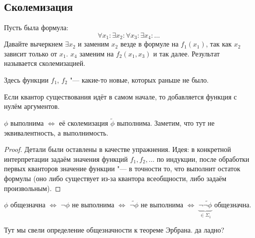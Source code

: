 \subsection{Сколемизация}
\begin{Def}
	Пусть была формула:
	\[ \forall x_1 \colon \exists x_2 \colon \forall x_3 \colon \exists x_4 \colon \dots \]
	Давайте вычеркнем $\exists x_2$ и заменим $x_2$ везде в формуле на $f_1(x_1)$,
	так как $x_2$ зависит только от $x_1$.
	$x_4$ заменим на $f_2(x_1, x_3)$ и так далее.
	Результат называется сколемизацией.

	Здесь функции $f_1$, $f_2$ "--- какие-то новые, которых раньше не было.

	Если квантор существования идёт в самом начале, то добавляется функция с нулём аргументов.
\end{Def}
\begin{assertion}
	$\phi$ выполнима $\iff$ её сколемизация $\tilde \phi$ выполнима.
	Заметим, что тут не эквивалентность, а выполнимость.
\end{assertion}
\begin{proof}
	Детали были оставлены в качестве упражнения.
	Идея: в конкретной интерпретации задаём значения функций $f_1, f_2, \dots$ по индукции, после обработки первых кванторов
	значение функции "--- в точности то, что выполнит остаток формулы (оно либо существует из-за квантора всеобщности, либо задаём произвольным).
\end{proof}
\begin{Rem}
	$\phi$ общезначна
	$\iff$ $\lnot \phi$ не выполнима
	$\iff$ $\widetilde{\lnot \phi}$ не выполнима
	$\iff$ $\underbrace{\lnot \widetilde{\lnot \phi}}_{\in \Sigma_1}$ общезначна.

	Тут мы свели определение общезначности к теореме Эрбрана.
	\TODO да ладно?
\end{Rem}

